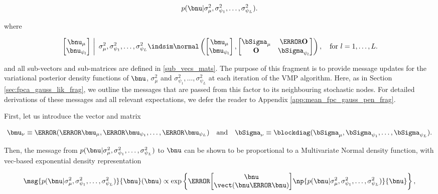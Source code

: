\documentclass[12pt]{article}
\def\Sigmanu{\bSigma_{\nu}}
\def\munu{\bmu_{\nu}}
\def\sigsqmu{\sigma^2_{\mu}}
\def\mumu{\bmu_\mu}
\def\numu{\bnu_\mu}
\newcommand\nupsi[1]{\bnu_{\psi_{#1}}}
\newcommand\sigsqpsi[1]{\sigma^2_{\psi_{#1}}}
\newcommand\mupsi[1]{\bmu_{\psi_#1}}
\theoremstyle{plain}
\theoremstyle{definition}
\theoremstyle{remark}
\begin{document}
\[
	p (\bnu | \sigsqmu, \sigsqpsi{1}, \dots, \sigsqpsi{L}).
\]

\noindent where

\begin{equation}
	\left.\begin{bmatrix}
		\numu \\
		\nupsi{l}
	\end{bmatrix} \ \right| \ \sigsqmu, \sigsqpsi{1}, \dots, \sigsqpsi{L}
		\indsim
			\normal \left(
				\begin{bmatrix}
					\bmu_\mu \\
					\bmu_{\psi_l} \\
				\end{bmatrix},
				\begin{bmatrix}
					\bSigma_\mu & \T{\textbf{O}} \\
					\textbf{O} & \bSigma_{\psi_l}
				\end{bmatrix}
			\right), \quad \text{for $l = 1, \dots, L$.}
\label{mean_fpc_gauss_pen_factor}
\end{equation}

\noindent and all sub-vectors and sub-matrices are defined in \eqref{sub_vecs_mats}. The purpose of
this fragment is to provide message updates for the variational posterior density functions of $\bnu$, $\sigsqmu$
and $\sigsqpsi{1}, \dots, \sigsqpsi{L}$ at each iteration of the VMP algorithm. Here, as in Section
\ref{sec:fpca_gauss_lik_frag}, we outline the messages that are passed from this factor to its neighbouring
stochastic nodes. For detailed derivations of these messages and all relevant expectations, we defer the
reader to Appendix \ref{app:mean_fpc_gauss_pen_frag}.

First, let us introduce the vector and matrix

\begin{equation}
	\munu \equiv \T{(\T{\mumu}, \T{\mupsi{1}}, \dots, \T{\mupsi{L}})} \quad
	\text{and} \quad
	\Sigmanu \equiv \blockdiag (\bSigma_\mu, \bSigma_{\psi_1}, \dots, \bSigma_{\psi_L}).
\label{munu_Sigmanu}
\end{equation}

\noindent Then, the message from $p (\bnu | \sigsqmu, \sigsqpsi{1}, \dots, \sigsqpsi{L})$ to $\bnu$
can be shown to be proportional to a Multivariate Normal density function, with vec-based exponential density
representation

\begin{equation}
	\msg{p (\bnu | \sigsqmu, \sigsqpsi{1}, \dots, \sigsqpsi{L})}{\bnu} (\bnu)
		\propto
			\exp \left\{
				\T{\begin{bmatrix}
					\bnu \\
					\vect (\bnu \T{\bnu})
				\end{bmatrix}}
				\np{p (\bnu | \sigsqmu, \sigsqpsi{1}, \dots, \sigsqpsi{L})}{\bnu}
			\right\},
\label{msg_pen_nu}
\end{equation}
\end{document}
